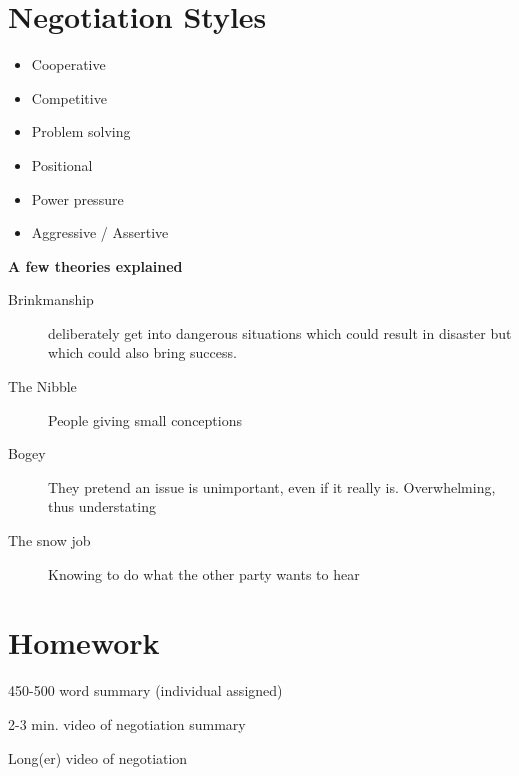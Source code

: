 \documentclass{article}
\begin{document}







\section{Negotiation Styles}

\begin{itemize}
  \item Cooperative
  \item Competitive
  \item Problem solving
  \item Positional
  \item Power pressure
  \item Aggressive / Assertive
\end{itemize}

\textbf{A few theories explained}

\begin{description}
  \item [Brinkmanship] deliberately get into dangerous situations which could result in disaster but which could also bring success.
  \item [The Nibble] People giving small conceptions
  \item[Bogey] They pretend an issue is unimportant, even if it really is. Overwhelming, thus understating
  \item[The snow job] Knowing to do what the other party wants to hear
\end{description}

\section{Homework}

450-500 word summary (individual assigned)

2-3 min. video of negotiation summary 

Long(er) video of negotiation
\end{document}
